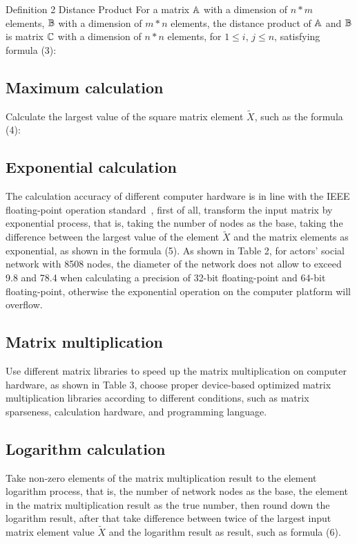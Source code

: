 \documentclass[review]{cvpr}
\begin{document}
Definition 2 Distance Product For a matrix $\Bbb A$ with a dimension of $n*m$ elements, $\Bbb B$ with a dimension of $m*n$ elements, the distance product of $\Bbb A$ and $\Bbb B$ is matrix $\Bbb C$ with a dimension of $n*n$ elements, for $1 \leq i$, $j \leq n$, satisfying formula (3):




\subsection{Maximum calculation}

Calculate the largest value of the square matrix element $\widetilde X$, such as the formula (4):

\subsection{Exponential calculation}

The calculation accuracy of different computer hardware is in line with the IEEE floating-point operation standard~\cite{ieee1985ieee}, first of all, transform the input matrix by exponential process, that is, taking the number of nodes as the base, taking the difference between the largest value of the element $\widetilde X$ and the matrix elements as exponential, as shown in the formula (5).
As shown in Table 2, for actors' social network with 8508 nodes, the diameter of the network does not allow to exceed 9.8 and 78.4 when calculating a precision of 32-bit floating-point and 64-bit floating-point, otherwise the exponential operation on the computer platform will overflow.

\subsection{Matrix multiplication}
Use different matrix libraries to speed up the matrix multiplication on computer hardware, as shown in Table 3, choose proper device-based optimized matrix multiplication libraries according to different conditions, such as matrix sparseness, calculation hardware, and programming language.

\subsection{Logarithm calculation}
Take non-zero elements of the matrix multiplication result to the element logarithm process, that is, the number of network nodes as the base, the element in the matrix multiplication result as the true number, then round down the logarithm result,
after that take difference between twice of the largest input matrix element value $\widetilde X$ and the logarithm result as result, such as formula (6).
\end{document}

